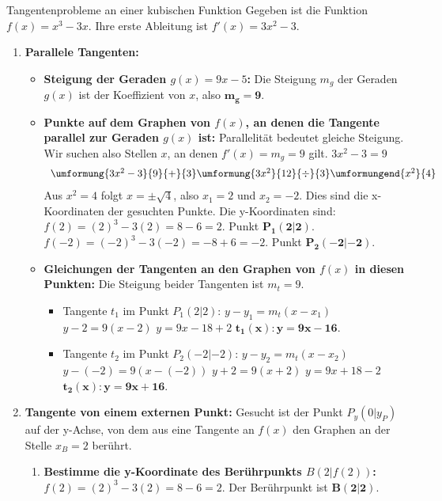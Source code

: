 \begin{loesungsumgebung}{Tangentenprobleme an einer kubischen Funktion}
Gegeben ist die Funktion $f(x) = x^3 - 3x$. Ihre erste Ableitung ist $f'(x) = 3x^2 - 3$.

\begin{enumerate}[label=(\alph*)]
    \item \textbf{Parallele Tangenten:}
    \begin{itemize}
        \item \textbf{Steigung der Geraden $g(x) = 9x - 5$:}
        Die Steigung $m_g$ der Geraden $g(x)$ ist der Koeffizient von $x$, also $\mathbf{m_g = 9}$.

        \item \textbf{Punkte auf dem Graphen von $f(x)$, an denen die Tangente parallel zur Geraden $g(x)$ ist:}
        Parallelität bedeutet gleiche Steigung. Wir suchen also Stellen $x$, an denen $f'(x) = m_g = 9$ gilt.
        $3x^2 - 3 = 9$
        $$
        \begin{array}{r c l c l}
        \umformung{3x^2 - 3}{9}{+}{3}
        \umformung{3x^2}{12}{\div}{3}
        \umformungend{x^2}{4}
        \end{array}
        $$
        Aus $x^2=4$ folgt $x = \pm\sqrt{4}$, also $x_1 = 2$ und $x_2 = -2$.
        Dies sind die x-Koordinaten der gesuchten Punkte. Die y-Koordinaten sind:
        $f(2) = (2)^3 - 3(2) = 8 - 6 = 2$. Punkt $\mathbf{P_1(2|2)}$.
        $f(-2) = (-2)^3 - 3(-2) = -8 + 6 = -2$. Punkt $\mathbf{P_2(-2|-2)}$.

        \item \textbf{Gleichungen der Tangenten an den Graphen von $f(x)$ in diesen Punkten:}
        Die Steigung beider Tangenten ist $m_t = 9$.
        \begin{itemize}
            \item Tangente $t_1$ im Punkt $P_1(2|2)$:
            $y - y_1 = m_t(x - x_1)$
            $y - 2 = 9(x - 2)$
            $y = 9x - 18 + 2$
            $\mathbf{t_1(x): y = 9x - 16}$.
            \item Tangente $t_2$ im Punkt $P_2(-2|-2)$:
            $y - y_2 = m_t(x - x_2)$
            $y - (-2) = 9(x - (-2))$
            $y + 2 = 9(x + 2)$
            $y = 9x + 18 - 2$
            $\mathbf{t_2(x): y = 9x + 16}$.
        \end{itemize}
    \end{itemize}

    \item \textbf{Tangente von einem externen Punkt:}
    Gesucht ist der Punkt $P_y(0|y_P)$ auf der y-Achse, von dem aus eine Tangente an $f(x)$ den Graphen an der Stelle $x_B=2$ berührt.
    \begin{enumerate}[label=\arabic*.]
        \item \textbf{Bestimme die y-Koordinate des Berührpunkts $B(2|f(2))$:}
        $f(2) = (2)^3 - 3(2) = 8 - 6 = 2$.
        Der Berührpunkt ist $\mathbf{B(2|2)}$.


\end{enumerate}
\end{enumerate}
\end{loesungsumgebung}
